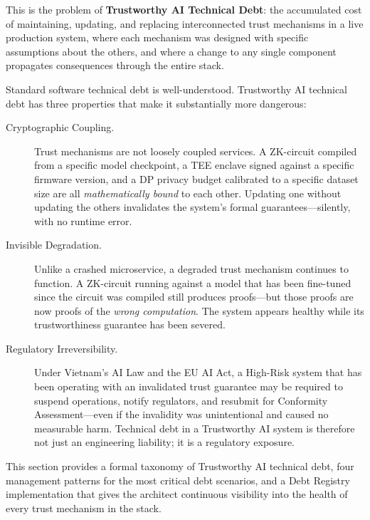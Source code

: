 This is the problem of \textbf{Trustworthy AI Technical Debt}:
the accumulated cost of maintaining, updating, and replacing
interconnected trust mechanisms in a live production system,
where each mechanism was designed with specific assumptions
about the others, and where a change to any single component
propagates consequences through the entire stack.

Standard software technical debt is well-understood.
Trustworthy AI technical debt has three properties that make it
substantially more dangerous:

\begin{description}
  \item[Cryptographic Coupling.]
    Trust mechanisms are not loosely coupled services.
    A ZK-circuit compiled from a specific model checkpoint,
    a TEE enclave signed against a specific firmware version,
    and a DP privacy budget calibrated to a specific dataset
    size are all \emph{mathematically bound} to each other.
    Updating one without updating the others invalidates
    the system's formal guarantees---silently, with no
    runtime error.

  \item[Invisible Degradation.]
    Unlike a crashed microservice, a degraded trust mechanism
    continues to function.
    A ZK-circuit running against a model that has been
    fine-tuned since the circuit was compiled still produces
    proofs---but those proofs are now proofs of the
    \emph{wrong computation}.
    The system appears healthy while its trustworthiness
    guarantee has been severed.

  \item[Regulatory Irreversibility.]
    Under Vietnam's AI Law and the EU AI Act, a High-Risk
    system that has been operating with an invalidated trust
    guarantee may be required to suspend operations, notify
    regulators, and resubmit for Conformity Assessment---even
    if the invalidity was unintentional and caused no
    measurable harm.
    Technical debt in a Trustworthy AI system is therefore
    not just an engineering liability; it is a regulatory
    exposure.
\end{description}

This section provides a formal taxonomy of Trustworthy AI
technical debt, four management patterns for the most critical
debt scenarios, and a Debt Registry implementation that gives
the architect continuous visibility into the health of every
trust mechanism in the stack.

